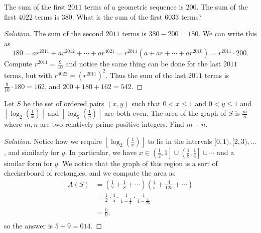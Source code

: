 \setcounter{section}{1}

\begin{prb}[2011 AIME II-5]
The sum of the first $2011$ terms of a geometric sequence is $200$. The sum of
the first $4022$ terms is $380$. What is the sum of the first $6033$ terms?
\end{prb}

\ifsolutions
\begin{proof}[Solution]
The sum of the second $2011$ terms is $380 - 200 = 180$. We can write this as
\[ 180 = ar^{2011} + ar^{2012} + \cdots + ar^{4021} = r^{2011} (a + ar + \cdots
+ ar^{2010}) = r^{2011} \cdot 200 . \]
Compute $r^{2011} = \frac{9}{10}$ and notice the same thing can be done for the
last $2011$ terms, but with $r^{4022} = (r^{2011})^2$. Thus the sum of the last
$2011$ terms is $\frac{9}{10} \cdot 180 = 162$, and $200 + 180 + 162 =
\boxed{542}$.
\end{proof}
\fi

\begin{prb}[2004 AIME I-12]
Let $S$ be the set of ordered pairs $(x, y)$ such that $0 < x \leq 1$ and $0 < y
\leq 1$ and $\left\lfloor \log_2 \left( \frac{1}{x} \right) \right\rfloor$ and
$\left\lfloor \log_5 \left( \frac{1}{y} \right) \right\rfloor$ are both even.
The area of the graph of $S$ is $\frac{m}{n}$ where $m, n$ are two relatively
prime positive integers. Find $m + n$.
\end{prb}

\ifsolutions
\begin{proof}[Solution]
Notice how we require $\left\lfloor \log_2 \left( \frac{1}{x} \right)
\right\rfloor$ to lie in the intervals $[0, 1), [2, 3), \dots$, and similarly
for $y$. In particular, we have $x \in \left( \frac{1}{2}, 1 \right] \cup \left(
\frac{1}{8}, \frac{1}{4} \right] \cup \cdots$ and a similar form for $y$. We
notice that the graph of this region is a sort of checkerboard of rectangles,
and we compute the area as
\[ \begin{aligned}
A(S) &= \left( \frac{1}{2} + \frac{1}{8} + \cdots \right) \left( \frac{4}{5} +
\frac{4}{125} + \cdots \right) \\
&= \frac{1}{2} \cdot \frac{4}{5} \cdot \frac{1}{1 - \frac{1}{4}} \cdot
\frac{1}{1 - \frac{1}{25}} \\
&= \frac{5}{9}, \\
\end{aligned} \]
so the answer is $5 + 9 = \boxed{014}$.
\end{proof}
\fi

